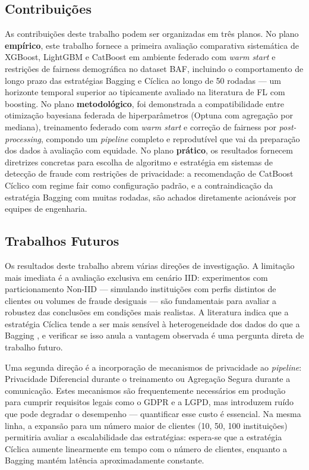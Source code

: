 \subsection{Contribuições}

As contribuições deste trabalho podem ser organizadas em três planos. No plano \textbf{empírico}, este trabalho fornece a primeira avaliação comparativa sistemática de XGBoost, LightGBM e CatBoost em ambiente federado com \textit{warm start} e restrições de fairness demográfica no dataset BAF, incluindo o comportamento de longo prazo das estratégias Bagging e Cíclica ao longo de 50 rodadas --- um horizonte temporal superior ao tipicamente avaliado na literatura de FL com boosting. No plano \textbf{metodológico}, foi demonstrada a compatibilidade entre otimização bayesiana federada de hiperparâmetros (Optuna com agregação por mediana), treinamento federado com \textit{warm start} e correção de fairness por \textit{post-processing}, compondo um \textit{pipeline} completo e reprodutível que vai da preparação dos dados à avaliação com equidade. No plano \textbf{prático}, os resultados fornecem diretrizes concretas para escolha de algoritmo e estratégia em sistemas de detecção de fraude com restrições de privacidade: a recomendação de CatBoost Cíclico com regime fair como configuração padrão, e a contraindicação da estratégia Bagging com muitas rodadas, são achados diretamente acionáveis por equipes de engenharia.

\subsection{Trabalhos Futuros}

Os resultados deste trabalho abrem várias direções de investigação. A limitação mais imediata é a avaliação exclusiva em cenário IID: experimentos com particionamento Non-IID --- simulando instituições com perfis distintos de clientes ou volumes de fraude desiguais --- são fundamentais para avaliar a robustez das conclusões em condições mais realistas. A literatura indica que a estratégia Cíclica tende a ser mais sensível à heterogeneidade dos dados do que a Bagging \cite{zhu2021noniid}, e verificar se isso anula a vantagem observada é uma pergunta direta de trabalho futuro.

Uma segunda direção é a incorporação de mecanismos de privacidade ao \textit{pipeline}: Privacidade Diferencial \cite{geyer2017differential} durante o treinamento ou Agregação Segura \cite{bonawitz2017secagg} durante a comunicação. Estes mecanismos são frequentemente necessários em produção para cumprir requisitos legais como o GDPR \cite{gdpr2016} e a LGPD, mas introduzem ruído que pode degradar o desempenho --- quantificar esse custo é essencial. Na mesma linha, a expansão para um número maior de clientes (10, 50, 100 instituições) permitiria avaliar a escalabilidade das estratégias: espera-se que a estratégia Cíclica aumente linearmente em tempo com o número de clientes, enquanto a Bagging mantém latência aproximadamente constante.

